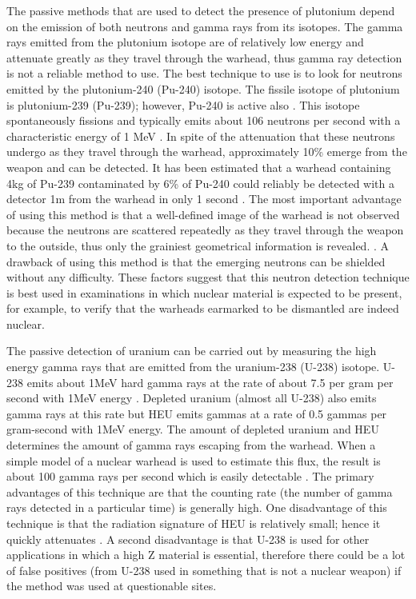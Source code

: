 \documentclass[twoside,titlepage,11pt,twocolumn,a4paper]{article}
\begin{document}
The passive methods that are used to detect the presence of plutonium
depend on the emission of both neutrons and gamma rays from its
isotopes. The gamma rays emitted from the plutonium isotope are of
relatively low energy and attenuate greatly as they travel through the
warhead, thus gamma ray detection is not a reliable method to use. The
best technique to use is to look for neutrons emitted by the
plutonium-240 (Pu-240) isotope. The fissile isotope of plutonium is
plutonium-239 (Pu-239); however, Pu-240 is active also
\citep{drell1993}. This isotope spontaneously fissions and typically
emits about 106 neutrons per second with a characteristic energy of 1
MeV \citep{drell1993}. In spite of the attenuation that these neutrons
undergo as they travel through the warhead, approximately 10\% emerge
from the weapon and can be detected. It has been estimated that a
warhead containing 4kg of Pu-239 contaminated by 6\% of Pu-240 could
reliably be detected with a detector 1m from the warhead in only 1
second \citep{drell1993}. The most important advantage of using this
method is that a well-defined image of the warhead is not observed
because the neutrons are scattered repeatedly as they travel through
the weapon to the outside, thus only the grainiest geometrical
information is revealed. \citep{drell1993,drell1990}. A drawback of
using this method is that the emerging neutrons can be shielded
without any difficulty. These factors suggest that this neutron
detection technique is best used in examinations in which nuclear
material is expected to be present, for example, to verify that the
warheads earmarked to be dismantled are indeed nuclear.

The passive detection of uranium can be carried out by measuring the
high energy gamma rays that are emitted from the uranium-238 (U-238)
isotope. U-238 emits about 1MeV hard gamma rays at the rate of about
7.5 per gram per second with 1MeV energy \citep{drell1993}. Depleted
uranium (almost all U-238) also emits gamma rays at this rate but HEU
emits gammas at a rate of 0.5 gammas per gram-second with 1MeV
energy. The amount of depleted uranium and HEU determines the amount
of gamma rays escaping from the warhead. When a simple model of a
nuclear warhead is used to estimate this flux, the result is about 100
gamma rays per second which is easily detectable
\citep{drell1993}. The primary advantages of this technique are that
the counting rate (the number of gamma rays detected in a particular
time) is generally high. One disadvantage of this technique is that
the radiation signature of HEU is relatively small; hence it quickly
attenuates \citep{nuclearMatDet}. A second disadvantage is that U-238
is used for other applications in which a high Z material is
essential, therefore there could be a lot of false positives (from
U-238 used in something that is not a nuclear weapon) if the method
was used at questionable sites.
\end{document}

